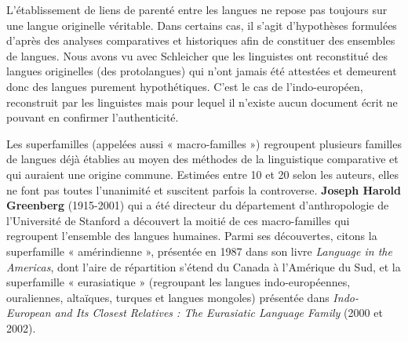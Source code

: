 L’établissement de liens de parenté entre les langues ne repose pas toujours sur une langue originelle véritable. Dans certains cas, il s’agit d’hypothèses formulées d’après des analyses comparatives et historiques afin de constituer des ensembles de langues. Nous avons vu avec Schleicher que les linguistes ont reconstitué des langues originelles (des protolangues) qui n’ont jamais été attestées et demeurent donc des langues purement hypothétiques. C’est le cas de l’indo-européen, reconstruit par les linguistes mais pour lequel il n’existe aucun document écrit ne pouvant en confirmer l’authenticité.

Les superfamilles (appelées aussi « macro-familles ») regroupent plusieurs familles de langues déjà établies au moyen des méthodes de la linguistique comparative et qui auraient une origine commune. Estimées entre 10 et 20 selon les auteurs, elles ne font pas toutes l’unanimité et suscitent parfois la controverse. \textbf{Joseph Harold Greenberg} (1915-2001) qui a été directeur du département d’anthropologie de l’Université de Stanford a découvert la moitié de ces macro-familles qui regroupent l’ensemble des langues humaines. Parmi ses découvertes, citons la superfamille « amérindienne », présentée en 1987 dans son livre \textit{Language in the Americas}, dont l’aire de répartition s’étend du Canada à l’Amérique du Sud, et la superfamille « eurasiatique » (regroupant les langues indo-européennes, ouraliennes, altaïques, turques et langues mongoles) présentée dans \textit{Indo-European and Its Closest Relatives : The Eurasiatic Language Family} (2000 et 2002).

